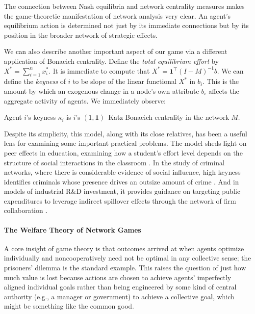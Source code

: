 \documentclass{notices}
\theoremstyle{definition}\newtheorem{problem}{Problem}
\begin{document}
The connection between Nash equilibria and network centrality measures makes the game-theoretic manifestation of network analysis very clear. An agent's equilibrium action is determined not just by its immediate connections but by its position in the broader network of strategic effects.


We can also describe another important aspect of our game via a different
application of Bonacich centrality.
Define the \emph{total equilibrium effort} by $X^{*}=\sum_{i=1}^n x_{i}^{*}$. It is immediate to compute that $X^* = \bm{1}^\top (I-M)^{-1} {b}$. 
We can define the \emph{keyness} of $i$ to be slope of the linear functional $X^*$ in $b_i$.
This is the amount by which an exogenous change in a node's own attribute $b_{i}$ affects
the aggregate activity of agents. We immediately observe:
\begin{fact} Agent $i$'s keyness $\kappa_i$ is $i$'s $(1,\bm{1})$--Katz-Bonacich centrality in the network $M$. \end{fact}


Despite its simplicity, this model, along with its close relatives, has been  a useful lens for examining some important practical problems. 
The model sheds light on peer effects in education, examining how a student's effort level depends on the structure of social interactions in the classroom \cite{CalvoArmengolPatacchiniZenou2009}. 
 In the study of criminal networks, where there is considerable evidence of social influence, high keyness identifies criminals whose presence drives an outsize amount of crime \cite{HellerJakubowskiJelvehKapustin2022}. And in models of industrial R\&D investment, it provides guidance on targeting public expenditures to leverage indirect spillover effects through the network of firm collaboration \cite{KonigLiuZenou2019}.

\paragraph{The Welfare Theory of Network Games}

A core insight of game theory is that outcomes arrived at when agents optimize individually and noncooperatively need not be optimal in any collective sense; the prisoners' dilemma is the standard example. This raises the question of just how much value is lost because actions are chosen to achieve agents' imperfectly aligned individual goals rather than being engineered by some kind of central authority (e.g., a manager or government) to achieve a collective goal, which might be something like the common good.
\end{document}
